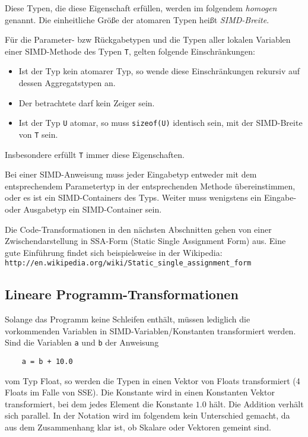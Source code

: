 \documentclass[a4paper,10pt]{article}
\begin{document}
Diese Typen, die diese Eigenschaft erfüllen, werden im folgendem \emph{homogen} genannt. Die einheitliche
Größe der atomaren Typen heißt \emph{SIMD-Breite}.

Für die Parameter- bzw Rückgabetypen und die Typen aller lokalen Variablen einer SIMD-Methode des
Typen \texttt{T}, gelten folgende Einschränkungen:

\begin{itemize}

    \item Ist der Typ kein atomarer Typ, so wende diese Einschränkungen rekursiv auf dessen 
    Aggregatstypen an.

    \item Der betrachtete darf kein Zeiger sein.

    \item Ist der Typ \texttt{U} atomar, so muss \texttt{sizeof(U)} identisch sein, mit der
    SIMD-Breite von \texttt{T} sein.

\end{itemize}

Insbesondere erfüllt \texttt{T} immer diese Eigenschaften.

Bei einer SIMD-Anweisung muss jeder Eingabetyp entweder mit dem entsprechendem Parametertyp in der
entsprechenden Methode übereinstimmen, oder es ist ein SIMD-Containers des Typs. Weiter muss wenigstens
ein Eingabe- oder Ausgabetyp ein SIMD-Container sein.

Die Code-Transformationen in den nächsten Abschnitten gehen von einer Zwischendarstellung in
SSA-Form (Static Single Assignment Form) aus. Eine gute Einführung findet sich beispielsweise in der
Wikipedia: \texttt{http://en.wikipedia.org/wiki/Static\_single\_assignment\_form}

\subsection{Lineare Programm-Transformationen}

Solange das Programm keine Schleifen enthält, müssen lediglich die vorkommenden Variablen in
SIMD-Variablen/Konstanten transformiert werden. Sind die Variablen \texttt{a} und \texttt{b} der
Anweisung
\begin{verbatim}
    a = b + 10.0
\end{verbatim}
vom Typ Float, so werden die Typen in einen Vektor von Floats transformiert (4 Floats im Falle von
SSE). Die Konstante wird in einen Konstanten Vektor transformiert, bei dem jedes Element die 
Konstante $1.0$ hält. Die Addition verhält sich parallel. In der Notation wird im folgendem kein 
Unterschied gemacht, da aus dem Zusammenhang klar ist, ob Skalare oder Vektoren gemeint sind.
\end{document}
